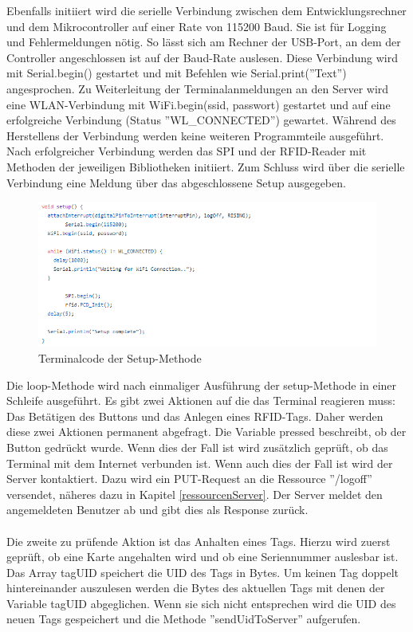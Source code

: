 \documentclass[12pt,titlepage]{scrartcl}
\begin{document}
		Ebenfalls initiiert wird die serielle Verbindung zwischen dem Entwicklungsrechner und dem Mikrocontroller auf einer Rate von 115200 Baud. Sie ist für Logging und Fehlermeldungen nötig. So lässt sich am Rechner der USB-Port, an dem der Controller angeschlossen ist auf der Baud-Rate auslesen. Diese Verbindung wird mit Serial.begin() gestartet und mit Befehlen wie Serial.print(''Text'') angesprochen. Zu Weiterleitung der Terminalanmeldungen an den Server wird eine WLAN-Verbindung mit WiFi.begin(ssid, passwort) gestartet und auf eine erfolgreiche Verbindung (Status ''WL\_CONNECTED'') gewartet. Während des Herstellens der Verbindung werden keine weiteren Programmteile ausgeführt. Nach erfolgreicher Verbindung werden das SPI und der RFID-Reader mit Methoden der jeweiligen Bibliotheken initiiert. Zum Schluss wird über die serielle Verbindung eine Meldung über das abgeschlossene Setup ausgegeben. \\
			\begin{figure}[H] 
  			\centering
    		\includegraphics[height=0.3\textheight]{terminalSetup}
  			\caption{Terminalcode der Setup-Methode}
  			\label{fig:terminalSetup}
		\end{figure}
		\noindent Die loop-Methode wird nach einmaliger Ausführung der setup-Methode in einer Schleife ausgeführt. Es gibt zwei Aktionen auf die das Terminal reagieren muss: Das Betätigen des Buttons und das Anlegen eines RFID-Tags. Daher werden diese zwei Aktionen permanent abgefragt. Die Variable pressed beschreibt, ob der Button gedrückt wurde. Wenn dies der Fall ist wird zusätzlich geprüft, ob das Terminal mit dem Internet verbunden ist. Wenn auch dies der Fall ist wird der Server kontaktiert. Dazu wird ein PUT-Request an die Ressource ''/logoff'' versendet, näheres dazu in Kapitel \ref{ressourcenServer}. Der Server meldet den angemeldeten Benutzer ab und gibt dies als Response zurück. \\ \\
		Die zweite zu prüfende Aktion ist das Anhalten eines Tags. Hierzu wird zuerst geprüft, ob eine Karte angehalten wird und ob eine Seriennummer auslesbar ist. Das Array tagUID speichert die UID des Tags in Bytes. Um keinen Tag doppelt hintereinander auszulesen werden die Bytes des aktuellen Tags mit denen der Variable tagUID abgeglichen. Wenn sie sich nicht entsprechen wird die UID des neuen Tags gespeichert und die Methode ''sendUidToServer'' aufgerufen.  \\
\end{document}

